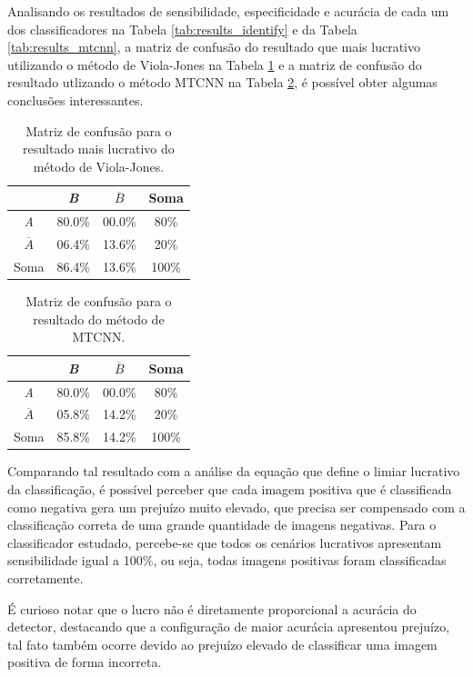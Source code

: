 Analisando os resultados de sensibilidade, especificidade e acurácia de cada um dos classificadores na Tabela \ref{tab:results_identify} e da Tabela \ref{tab:results_mtcnn}, a matriz de confusão do resultado que mais lucrativo utilizando o método de Viola-Jones na Tabela \ref{tab:matriz_de_confusao_viola} e a matriz de confusão do resultado utlizando o método MTCNN na Tabela \ref{tab:matriz_de_confusao_mtcnn}, é possível obter algumas conclusões interessantes.

\begin{table}[htbp]
    \caption{Matriz de confusão para o resultado mais lucrativo do método de Viola-Jones.}
    \label{tab:matriz_de_confusao_viola}
    \centering
    \renewcommand{\arraystretch}{1.4}
    \begin{tabular}{c|cc|c}\hline\hline
                       & \textit{B} & $\overline{B}$ & Soma  \\
        \hline
        \textit{A}     & 80.0\%     & 00.0\%         & 80\%  \\
        $\overline{A}$ & 06.4\%     & 13.6\%         & 20\%  \\
        \hline
        Soma           & 86.4\%     & 13.6\%         & 100\% \\
        \hline\hline
    \end{tabular}
\end{table}

\begin{table}[htbp]
    \caption{Matriz de confusão para o resultado do método de MTCNN.}
    \label{tab:matriz_de_confusao_mtcnn}
    \centering
    \renewcommand{\arraystretch}{1.4}
    \begin{tabular}{c|cc|c}\hline\hline
                       & \textit{B} & $\overline{B}$ & Soma  \\
        \hline
        \textit{A}     & 80.0\%     & 00.0\%         & 80\%  \\
        $\overline{A}$ & 05.8\%     & 14.2\%         & 20\%  \\
        \hline
        Soma           & 85.8\%     & 14.2\%         & 100\% \\
        \hline\hline
    \end{tabular}
\end{table}

Comparando tal resultado com a análise da equação que define o limiar lucrativo da classificação, é possível perceber que cada imagem positiva que é classificada como negativa gera um prejuízo muito elevado, que precisa ser compensado com a classificação correta de uma grande quantidade de imagens negativas. Para o classificador estudado, percebe-se que todos os cenários lucrativos apresentam sensibilidade igual a 100\%, ou seja, todas imagens positivas foram classificadas corretamente.

É curioso notar que o lucro não é diretamente proporcional a acurácia do detector, destacando que a configuração de maior acurácia apresentou prejuízo, tal fato também ocorre devido ao prejuízo elevado de classificar uma imagem positiva de forma incorreta.
